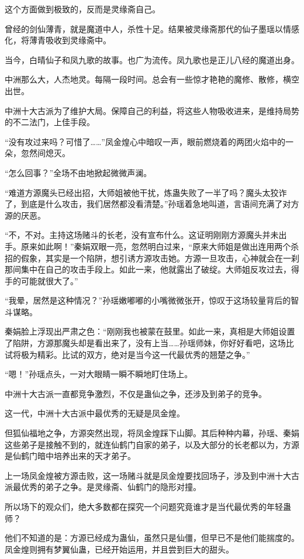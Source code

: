 \begin{this_body}
这个方面做到极致的，反而是灵缘斋自己。

曾经的剑仙薄青，就是魔道中人，杀性十足。结果被灵缘斋那代的仙子墨瑶以情感化，将薄青吸收到灵缘斋中。

当今，白晴仙子和凤九歌的故事。也广为流传。凤九歌也是正儿八经的魔道出身。

中洲那么大，人杰地灵。每隔一段时间。总会有一些惊才艳艳的魔修、散修，横空出世。

中洲十大古派为了维护大局。保障自己的利益，将这些人物吸收进来，是维持局势的不二法门，上佳手段。

“没有攻过来吗？可惜了……”凤金煌心中暗叹一声，眼前燃烧着的两团火焰中的一朵，忽然间熄灭。

“怎么回事？”全场不由地掀起微微声澜。

“难道方源魔头已经出招，大师姐被他干扰，炼蛊失败了一半了吗？魔头太狡诈了，到底是什么攻击，我们居然都没看清楚。”孙瑶着急地叫道，言语间充满了对方源的厌恶。

“不，不对。主持这场赌斗的长老，没有宣布什么。这证明刚刚方源魔头并未出手。原来如此啊！”秦娟双眼一亮，忽然明白过来，“原来大师姐是做出连用两个杀招的假象，其实是一个陷阱，想引诱方源攻击她。方源一旦攻击，心神就会在一刹那间集中在自己的攻击手段上。如此一来，他就露出了破绽。大师姐反攻过去，得手的可能就很大了。”

“我晕，居然是这种情况？”孙瑶嫩嘟嘟的小嘴微微张开，惊叹于这场较量背后的智斗谋略。

秦娟脸上浮现出严肃之色：“刚刚我也被蒙在鼓里。如此一来，真相是大师姐设置了陷阱，方源那魔头却是看出来了，没有上当……孙瑶师妹，你好好看吧，这场比试将极为精彩。比试的双方，绝对是当今这一代最优秀的翘楚之争。”

“嗯！”孙瑶点头，一对大眼睛一瞬不瞬地盯住场上。

中洲十大古派一直都竞争激烈，不仅是蛊仙之争，还涉及到弟子的竞争。

这一代，中洲十大古派中最优秀的无疑是凤金煌。

但狐仙福地之争，方源突然出现，将凤金煌踩下山脚。其后种种内幕，孙瑶、秦娟这些弟子是接触不到的，就连仙鹤门自家的弟子，以及大部分的长老都以为，方源是仙鹤门暗中培养出来的天才弟子。

上一场凤金煌被方源击败，这一场赌斗就是凤金煌要找回场子，涉及到中洲十大古派最优秀的弟子之争。是灵缘斋、仙鹤门的隐形对撞。

所以场下的观众们，绝大多数都在探究一个问题究竟谁才是当代最优秀的年轻蛊师？

他们不知道的是：方源已经成为蛊仙，虽然只是仙僵，但早已不是他们能揣度的。凤金煌则拥有梦翼仙蛊，已经开始运用，并且尝到巨大的甜头。


\end{this_body}
